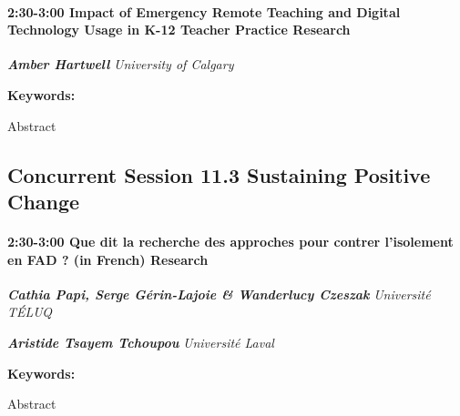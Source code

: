 \documentclass[
]{book}
\begin{document}
\begin{session}
\hypertarget{impact-of-emergency-remote-teaching-and-digital-technology-usage-in-k-12-teacher-practice-research}{%
\paragraph*{\texorpdfstring{2:30-3:00 \textbar{} \textbf{Impact of
Emergency Remote Teaching and Digital Technology Usage in K-12 Teacher
Practice} \textbar{}
Research}{2:30-3:00 \textbar{} Impact of Emergency Remote Teaching and Digital Technology Usage in K-12 Teacher Practice \textbar{} Research}}\label{impact-of-emergency-remote-teaching-and-digital-technology-usage-in-k-12-teacher-practice-research}}

\textbf{\emph{Amber Hartwell}} \textbar{} \emph{University of Calgary}

\textbf{Keywords:}

Abstract
\end{session}

\hypertarget{concurrent-session-11.3-sustaining-positive-change}{%
\subsection*{Concurrent Session 11.3 \textbar{} Sustaining Positive Change}\label{concurrent-session-11.3-sustaining-positive-change}}

\begin{session}
\hypertarget{que-dit-la-recherche-des-approches-pour-contrer-lisolement-en-fad-in-french-research}{%
\paragraph*{\texorpdfstring{2:30-3:00 \textbar{} \textbf{Que dit la
recherche des approches pour contrer l'isolement en FAD ? (in French)}
\textbar{}
Research}{2:30-3:00 \textbar{} Que dit la recherche des approches pour contrer l'isolement en FAD ? (in French) \textbar{} Research}}\label{que-dit-la-recherche-des-approches-pour-contrer-lisolement-en-fad-in-french-research}}

\textbf{\emph{Cathia Papi, Serge Gérin-Lajoie \& Wanderlucy Czeszak}}
\textbar{} \emph{Université TÉLUQ}

\textbf{\emph{Aristide Tsayem Tchoupou}} \textbar{} \emph{Université
Laval}

\textbf{Keywords:}

Abstract
\end{session}
\end{document}
